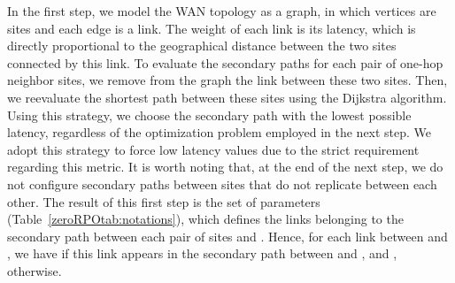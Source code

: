 \documentclass[preprint]{elsarticle}
\begin{document}
In the first step, we model the WAN topology as a graph, in which vertices are sites and each edge is a link. The weight of each link is its latency, which is directly proportional to the geographical distance between the two sites connected by this link. To evaluate the secondary paths for each pair of one-hop neighbor sites, we remove from the graph the link between these two sites. Then, we reevaluate the shortest path between these sites using the Dijkstra algorithm. Using this strategy, we choose the secondary path with the lowest possible latency, regardless of the optimization problem employed in the next step. We adopt this strategy to force low latency values due to the strict requirement regarding this metric. It is worth noting that, at the end of the next step, we do not configure secondary paths between sites that do not replicate between each other.
The result of this first step is the set of  parameters (Table~\ref{zeroRPOtab:notations}), which defines the links belonging to the secondary path between each pair of sites  and . Hence, for each link between  and , we have  if this link appears in the secondary path between  and , and , otherwise.
\end{document}

